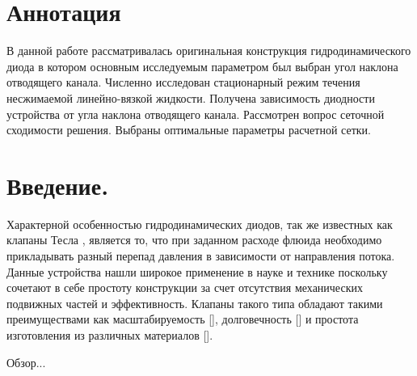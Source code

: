 \documentclass[14pt,a4paper]{article}
\begin{document}
    
    \section*{Аннотация}

        В данной работе рассматривалась оригинальная конструкция гидродинамического диода в котором основным исследуемым параметром был выбран угол наклона отводящего канала. Численно исследован стационарный режим течения несжимаемой линейно-вязкой жидкости. Получена зависимость диодности устройства от угла наклона отводящего канала. Рассмотрен вопрос сеточной сходимости решения. Выбраны оптимальные параметры расчетной сетки.

    \section*{Введение.}

        Характерной особенностью гидродинамических диодов, так же известных как клапаны Тесла \cite{TeslaValveReview}, является то, что при заданном расходе флюида необходимо прикладывать разный перепад давления в зависимости от направления потока. Данные устройства нашли широкое применение в науке и технике поскольку сочетают в себе простоту конструкции за счет отсутствия механических подвижных частей и эффективность. Клапаны такого типа обладают такими преимуществами как масштабируемость [], долговечность [] и простота изготовления из различных материалов [].

        Обзор...



\end{document}
